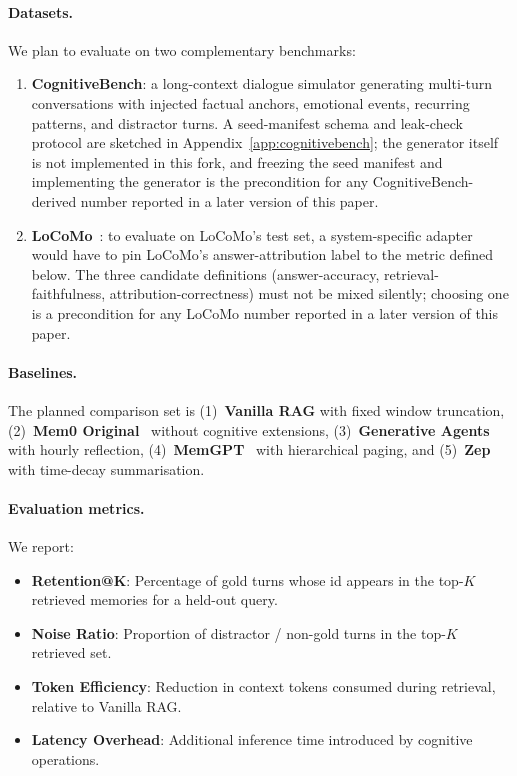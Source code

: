 \paragraph{Datasets.} We plan to evaluate on two complementary benchmarks:
\begin{enumerate}
    \item \textbf{CognitiveBench}: a long-context dialogue simulator generating multi-turn conversations with injected factual anchors, emotional events, recurring patterns, and distractor turns. A seed-manifest schema and leak-check protocol are sketched in Appendix~\ref{app:cognitivebench}; the generator itself is not implemented in this fork, and freezing the seed manifest and implementing the generator is the precondition for any CognitiveBench-derived number reported in a later version of this paper.
    \item \textbf{LoCoMo}~\cite{locomo}: to evaluate on LoCoMo's test set, a system-specific adapter would have to pin LoCoMo's answer-attribution label to the metric defined below. The three candidate definitions (answer-accuracy, retrieval-faithfulness, attribution-correctness) must not be mixed silently; choosing one is a precondition for any LoCoMo number reported in a later version of this paper.
\end{enumerate}

\paragraph{Baselines.} The planned comparison set is
(1)~\textbf{Vanilla RAG} with fixed window truncation,
(2)~\textbf{Mem0 Original}~\cite{mem0} without cognitive extensions,
(3)~\textbf{Generative Agents}~\cite{generative_agents} with hourly reflection,
(4)~\textbf{MemGPT}~\cite{memgpt} with hierarchical paging, and
(5)~\textbf{Zep}~\cite{zep} with time-decay summarisation.

\paragraph{Evaluation metrics.} We report:
\begin{itemize}
    \item \textbf{Retention@K}: Percentage of gold turns whose id appears in the top-$K$ retrieved memories for a held-out query.
    \item \textbf{Noise Ratio}: Proportion of distractor / non-gold turns in the top-$K$ retrieved set.
    \item \textbf{Token Efficiency}: Reduction in context tokens consumed during retrieval, relative to Vanilla RAG.
    \item \textbf{Latency Overhead}: Additional inference time introduced by cognitive operations.
\end{itemize}
